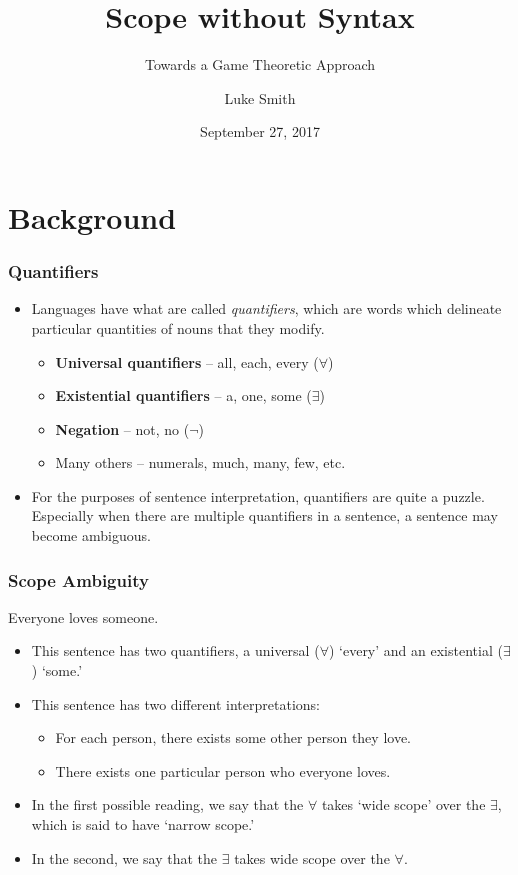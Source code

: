 \documentclass{beamer}
\title{Scope without Syntax}
\subtitle{Towards a Game Theoretic Approach}
\author{Luke Smith}
\date{September 27, 2017}
\institute{Committee: Robert, MPP, TgB}
\begin{document}

\begin{frame}
\titlepage
\end{frame}

\section{Background}

\begin{frame}
\frametitle{Quantifiers}\pause
\begin{itemize}
\item Languages have what are called \emph{quantifiers}, which are words which delineate particular quantities of nouns that they modify.\pause
\begin{itemize}
\item \textbf{Universal quantifiers} -- all, each, every ($\forall$)\pause
\item \textbf{Existential quantifiers} -- a, one, some ($\exists$)\pause
\item \textbf{Negation} -- not, no ($\neg$)\pause
\item Many others -- numerals, much, many, few, etc.\pause
\end{itemize}

\item For the purposes of sentence interpretation, quantifiers are quite a puzzle. Especially when there are multiple quantifiers in a sentence, a sentence may become ambiguous.
\end{itemize}

\end{frame}

\begin{frame}
\frametitle{Scope Ambiguity}\pause
\begin{exe}
\ex Everyone loves someone.
\end{exe}\pause
\begin{itemize}
\item This sentence has two quantifiers, a universal ($\forall$) `every' and an existential ($\exists$) `some.'\pause
\item This sentence has two different interpretations:\pause
\begin{itemize}
\item For each person, there exists some other person  they love.\pause
\item There exists one particular person who everyone loves.\pause
\end{itemize}
\item In the first possible reading, we say that the $\forall$ takes `wide scope' over the $\exists$, which is said to have `narrow scope.'\pause

\item In the second, we say that the $\exists$ takes wide scope over the $\forall$.
\end{itemize}
\end{frame}
\end{document}
